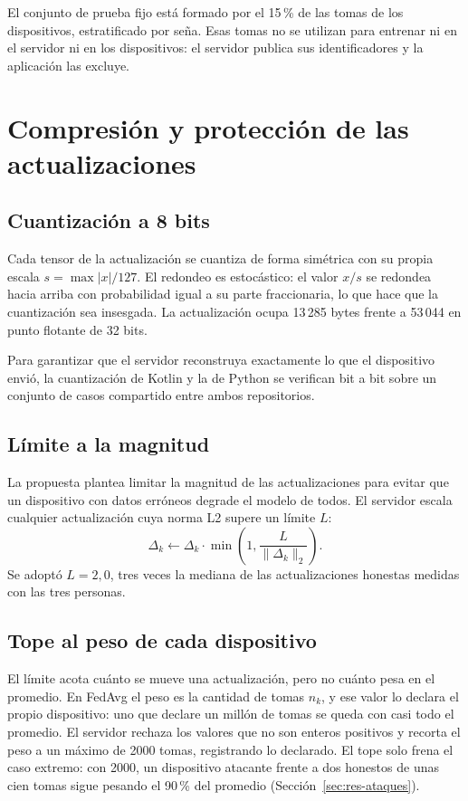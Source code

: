 El conjunto de prueba fijo está formado por el 15\,\% de las tomas de los dispositivos, estratificado por seña. Esas tomas no se utilizan para entrenar ni en el servidor ni en los dispositivos: el servidor publica sus identificadores y la aplicación las excluye.

\section{Compresión y protección de las actualizaciones}
\label{sec:proteccion-federado}

\subsection{Cuantización a 8 bits}

Cada tensor de la actualización se cuantiza de forma simétrica con su propia escala $s = \max|x| / 127$. El redondeo es estocástico: el valor $x/s$ se redondea hacia arriba con probabilidad igual a su parte fraccionaria, lo que hace que la cuantización sea insesgada. La actualización ocupa 13\,285 bytes frente a 53\,044 en punto flotante de 32 bits.

Para garantizar que el servidor reconstruya exactamente lo que el dispositivo envió, la cuantización de Kotlin y la de Python se verifican bit a bit sobre un conjunto de casos compartido entre ambos repositorios.

\subsection{Límite a la magnitud}

La propuesta plantea limitar la magnitud de las actualizaciones para evitar que un dispositivo con datos erróneos degrade el modelo de todos. El servidor escala cualquier actualización cuya norma L2 supere un límite $L$:
\begin{equation}
    \Delta_k \leftarrow \Delta_k \cdot \min\left(1, \frac{L}{\lVert \Delta_k \rVert_2}\right).
\end{equation}
Se adoptó $L = 2{,}0$, tres veces la mediana de las actualizaciones honestas medidas con las tres personas.

\subsection{Tope al peso de cada dispositivo}

El límite acota cuánto se mueve una actualización, pero no cuánto pesa en el promedio. En FedAvg el peso es la cantidad de tomas $n_k$, y ese valor lo declara el propio dispositivo: uno que declare un millón de tomas se queda con casi todo el promedio. El servidor rechaza los valores que no son enteros positivos y recorta el peso a un máximo de 2000 tomas, registrando lo declarado. El tope solo frena el caso extremo: con 2000, un dispositivo atacante frente a dos honestos de unas cien tomas sigue pesando el 90\,\% del promedio (Sección~\ref{sec:res-ataques}).

